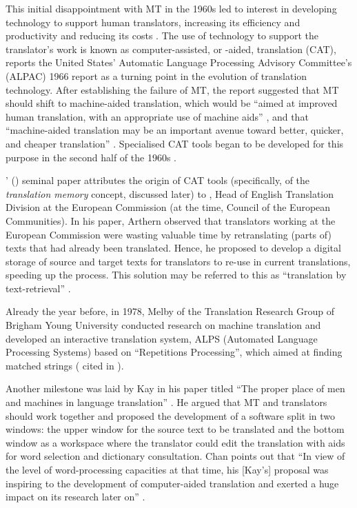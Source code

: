 This initial disappointment with MT in the 1960s led to interest in developing technology to support human translators, increasing its efficiency and productivity and reducing its costs \citep[4]{chan2015}. The use of technology to support the translator’s work is known as computer-assisted, or -aided, translation (CAT), \citet[4]{chan2015} reports the United States’ Automatic Language Processing Advisory Committee’s (ALPAC) 1966 report as a turning point in the evolution of translation technology. After establishing the failure of MT, the report suggested that MT should shift to machine-aided translation, which would be ``aimed at improved human translation, with an appropriate use of machine aids'' \citep[iii]{ALPAC1966}, and that ``machine-aided translation may be an important avenue toward better, quicker, and cheaper translation'' \citep[32]{ALPAC1966}. Specialised CAT tools began to be developed for this purpose in the second half of the 1960s \citep{chan2015}.

\citeauthor{hutchins1998origins}' (\citeyear{hutchins1998origins}) seminal paper attributes the origin of CAT tools (specifically, of the \textit{translation memory} concept, discussed later) to \citet{arthern1978machine}, Head of English Translation Division at the European Commission (at the time, Council of the European Communities). In his paper, Arthern observed that translators working at the European Commission were wasting valuable time by retranslating (parts of) texts that had already been translated. Hence, he proposed to develop a digital storage of source and target texts for translators to re-use in current translations, speeding up the process. This solution may be referred to this as ``translation by text-retrieval'' \citep[94]{arthern1978machine}.

Already the year before, in 1978, Melby of the Translation Research Group of Brigham Young University conducted research on machine translation and developed an interactive translation system, ALPS (Automated Language Processing Systems) based on “Repetitions Processing”, which aimed at finding matched strings (\citealt{Melby1978} cited in \cite[4]{chan2015}).

Another milestone was laid by Kay in his paper titled ``The proper place of men and machines in language translation'' \citep{kay1980}. He argued that MT and translators should work together and proposed the development of a software split in two windows: the upper window for the source text to be translated and the bottom window as a workspace where the translator could edit the translation with aids for word selection and dictionary consultation. Chan points out that ``In view of the level of word-processing capacities at that time, his [Kay’s] proposal was inspiring to the development of computer-aided translation and exerted a huge impact on its research later on'' \citep[5]{chan2015}.


